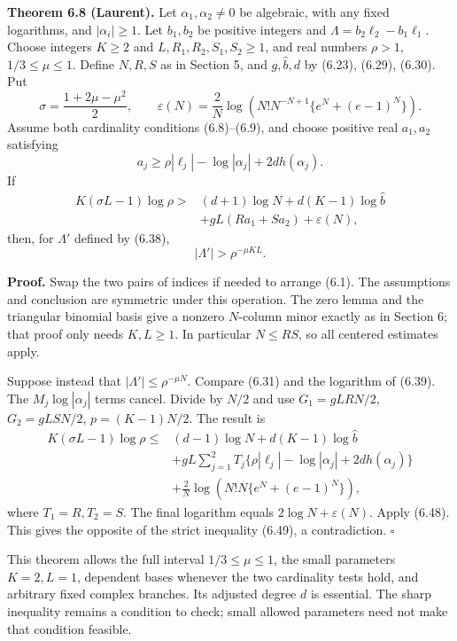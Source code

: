 \documentclass[
  11pt,
  a4paper,
]{article}
\begin{document}
\textbf{Theorem 6.8 (Laurent).} Let \(\alpha_1,\alpha_2\ne0\) be
algebraic, with any fixed logarithms, and \(|\alpha_i|\ge1\). Let
\(b_1,b_2\) be positive integers and \(\Lambda=b_2\ell_2-b_1\ell_1\).
Choose integers \(K\ge2\) and \(L,R_1,R_2,S_1,S_2\ge1\), and real
numbers \(\rho>1\), \(1/3\le\mu\le1\). Define \(N,R,S\) as in Section 5,
and \(g,\widehat b,d\) by (6.23), (6.29), (6.30). Put \[
\sigma=\frac{1+2\mu-\mu^2}{2},\qquad
\varepsilon(N)=\frac2N\log\left(N!N^{-N+1}\{e^N+(e-1)^N\}\right).
\tag{6.47}
\] Assume both cardinality conditions (6.8)--(6.9), and choose positive
real \(a_1,a_2\) satisfying \[
a_j\ge\rho|\ell_j|-\log|\alpha_j|+2dh(\alpha_j).
\tag{6.48}
\] If \[
\begin{aligned}
K(\sigma L-1)\log\rho>{}&(d+1)\log N+d(K-1)\log\widehat b\\
&+gL(Ra_1+Sa_2)+\varepsilon(N),
\end{aligned}
\tag{6.49}
\] then, for \(\Lambda'\) defined by (6.38), \[
|\Lambda'|>\rho^{-\mu KL}.
\tag{6.50}
\]

\textbf{Proof.} Swap the two pairs of indices if needed to arrange
(6.1). The assumptions and conclusion are symmetric under this
operation. The zero lemma and the triangular binomial basis give a
nonzero \(N\)-column minor exactly as in Section 6; that proof only
needs \(K,L\ge1\). In particular \(N\le RS\), so all centered estimates
apply.

Suppose instead that \(|\Lambda'|\le\rho^{-\mu N}\). Compare (6.31) and
the logarithm of (6.39). The \(M_j\log|\alpha_j|\) terms cancel. Divide
by \(N/2\) and use \(G_1=gLRN/2\), \(G_2=gLSN/2\), \(p=(K-1)N/2\). The
result is \[
\begin{aligned}
K(\sigma L-1)\log\rho\le{}&(d-1)\log N
+d(K-1)\log\widehat b\\
&+gL\sum_{j=1}^{2}T_j
 \{\rho|\ell_j|-\log|\alpha_j|+2dh(\alpha_j)\}\\
&+\frac2N\log\left(N!N\{e^N+(e-1)^N\}\right),
\end{aligned}
\tag{6.51}
\] where \(T_1=R,T_2=S\). The final logarithm equals
\(2\log N+\varepsilon(N)\). Apply (6.48). This gives the opposite of the
strict inequality (6.49), a contradiction. \(\square\)

This theorem allows the full interval \(1/3\le\mu\le1\), the small
parameters \(K=2,L=1\), dependent bases whenever the two cardinality
tests hold, and arbitrary fixed complex branches. Its adjusted degree
\(d\) is essential. The sharp inequality remains a condition to check;
small allowed parameters need not make that condition feasible.
\end{document}
